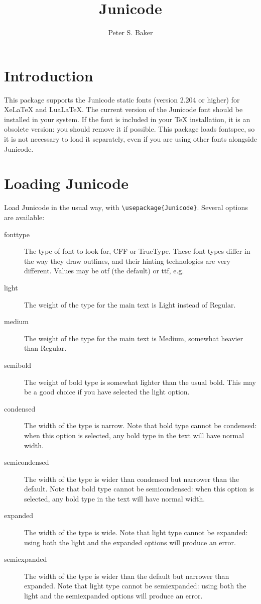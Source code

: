 \documentclass{article}
\title{Junicode}
\author{Peter S. Baker}
\date{}
\begin{document}
\maketitle

\section{Introduction}

This package supports the Junicode static fonts (version 2.204 or higher)
for XeLaTeX and LuaLaTeX. The current version of the Junicode font should
be installed in your system. If the font is included in your TeX installation,
it is an obsolete version: you should remove it if possible. This package loads
fontspec, so it is not necessary to load it separately, even if you are using
other fonts alongside Junicode.

\section{Loading Junicode}

Load Junicode in the usual way, with {\small\verb|\usepackage{Junicode}|}. Several options are available:

\begin{description}
\item[fonttype] The type of font to look for, CFF or TrueType. These font types differ in the
way they draw outlines, and their hinting technologies are very different. Values may be otf
(the default) or ttf, e.g.\\
\hspace*{1in}{\small\verb|\usepackage[fonttype=ttf]{Junicode}|}
\item[light] The weight of the type for the main text is Light instead of Regular.
\item[medium] The weight of the type for the main text is Medium, somewhat heavier than Regular.
\item[semibold] The weight of bold type is somewhat lighter than the usual bold. This may be a
good choice if you have selected the light option.
\item[condensed] The width of the type is narrow. Note that bold type cannot be condensed: when
this option is selected, any bold type in the text will have normal width.
\item[semicondensed] The width of the type is wider than condensed but narrower than the default.
Note that bold type cannot be semicondensed: when this option is selected, any bold type in the
text will have normal width.
\item[expanded] The width of the type is wide. Note that light type cannot be expanded: using
both the light and the expanded options will produce an error.
\item[semiexpanded] The width of the type is wider than the default but narrower than expanded.
Note that light type cannot be semiexpanded: using both the light and the semiexpanded options
will produce an error.
\end{description}
\end{document}

